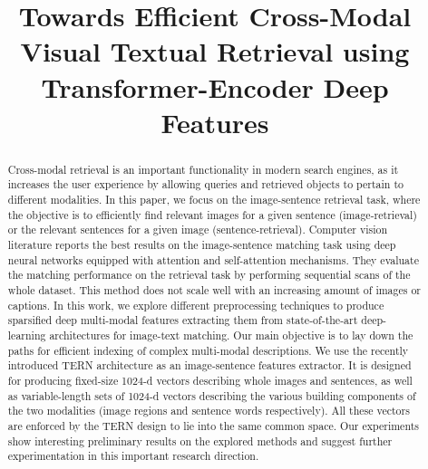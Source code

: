 \documentclass[conference]{IEEEtran}
\begin{document}
\title{Towards Efficient Cross-Modal Visual Textual Retrieval using Transformer-Encoder Deep Features}

\author{
\and
{}
}

\maketitle

\begin{abstract}
Cross-modal retrieval is an important functionality in modern search engines, as it increases the user experience by allowing queries and retrieved objects to pertain to different modalities.
In this paper, we focus on the image-sentence retrieval task, where the objective is to efficiently find relevant images for a given sentence (image-retrieval) or the relevant sentences for a given image (sentence-retrieval). 
Computer vision literature reports the best results on the image-sentence matching task using deep neural networks equipped with attention and self-attention mechanisms. They evaluate the matching performance on the retrieval task by performing sequential scans of the whole dataset. This method does not scale well with an increasing amount of images or captions.
In this work, we explore different preprocessing techniques to produce sparsified deep multi-modal features extracting them from state-of-the-art deep-learning architectures for image-text matching. Our main objective is to lay down the paths for efficient indexing of complex multi-modal descriptions.
We use the recently introduced TERN architecture as an image-sentence features extractor. It is designed for producing fixed-size 1024-d vectors describing whole images and sentences, as well as variable-length sets of 1024-d vectors describing the various building components of the two modalities (image regions and sentence words respectively). All these vectors are enforced by the TERN design to lie into the same common space.
Our experiments show interesting preliminary results on the explored methods and suggest further experimentation in this important research direction.
\end{abstract}
\end{document}
